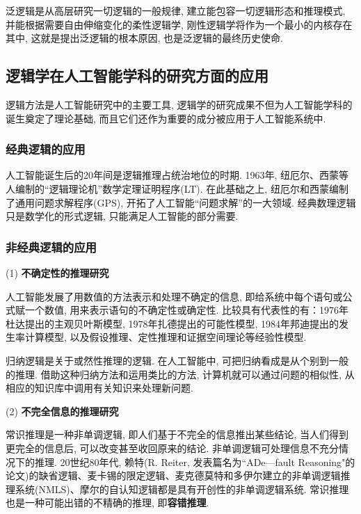 泛逻辑是从高层研究一切逻辑的一般规律, 建立能包容一切逻辑形态和推理模式, 并能根据需要自由伸缩变化的柔性逻辑学, 刚性逻辑学将作为一个最小的内核存在其中, 这就是提出泛逻辑的根本原因, 也是泛逻辑的最终历史使命.
\subsection{逻辑学在人工智能学科的研究方面的应用}

逻辑方法是人工智能研究中的主要工具, 逻辑学的研究成果不但为人工智能学科的诞生奠定了理论基础, 而且它们还作为重要的成分被应用于人工智能系统中.
\subsubsection{经典逻辑的应用}

人工智能诞生后的20年间是逻辑推理占统治地位的时期. 1963年, 纽厄尔、西蒙等人编制的“逻辑理论机”数学定理证明程序(LT). 在此基础之上, 纽厄尔和西蒙编制了通用问题求解程序(GPS), 开拓了人工智能“问题求解”的一大领域. 经典数理逻辑只是数学化的形式逻辑, 只能满足人工智能的部分需要.
\subsubsection{非经典逻辑的应用}

(1) \textbf{不确定性的推理研究}

人工智能发展了用数值的方法表示和处理不确定的信息, 即给系统中每个语句或公式赋一个数值, 用来表示语句的不确定性或确定性. 比较具有代表性的有：1976年杜达提出的主观贝叶斯模型,  1978年扎德提出的可能性模型,  1984年邦迪提出的发生率计算模型, 以及假设推理、定性推理和证据空间理论等经验性模型.

归纳逻辑是关于或然性推理的逻辑. 在人工智能中, 可把归纳看成是从个别到一般的推理. 借助这种归纳方法和运用类比的方法, 计算机就可以通过问题的相似性, 从相应的知识库中调用有关知识来处理新问题.

(2) \textbf{不完全信息的推理研究}

常识推理是一种非单调逻辑, 即人们基于不完全的信息推出某些结论, 当人们得到更完全的信息后, 可以改变甚至收回原来的结论. 非单调逻辑可处理信息不充分情况下的推理.
20世纪80年代, 赖特(R. Reiter, 发表篇名为``ADe—fault  Reasoning"的论文)的缺省逻辑、麦卡锡的限定逻辑、麦克德莫特和多伊尔建立的非单调逻辑推理系统(NMLS)、摩尔的自认知逻辑都是具有开创性的非单调逻辑系统. 常识推理也是一种可能出错的不精确的推理, 即\textbf{容错推理}.


